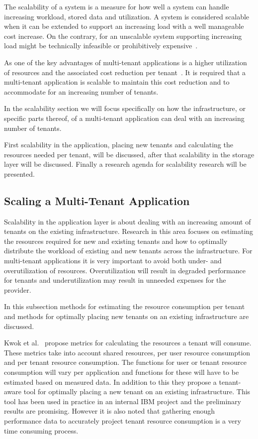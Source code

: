 The scalability of a system is a measure for how well a system can handle increasing workload, stored data and utilization.
A system is considered scalable when it can be extended to support an increasing load with a well manageable cost increase.
On the contrary, for an unscalable system supporting increasing load might be technically infeasible or prohibitively expensive~\cite{bondi2000scalability}.

As one of the key advantages of multi-tenant applications is a higher utilization of resources and the associated cost reduction per tenant~\cite{bezemer2010multi}.
It is required that a multi-tenant application is scalable to maintain this cost reduction and to accommodate for an increasing number of tenants.

In the scalability section we will focus specifically on how the infrastructure, or specific parts thereof, of a multi-tenant application can deal with an increasing number of tenants.

First scalability in the application, placing new tenants and calculating the resources needed per tenant, will be discussed, after that scalability in the storage layer will be discussed. 
Finally a research agenda for scalability research will be presented.

\subsection{Scaling a Multi-Tenant Application}
\label{sec:scal_mta}
Scalability in the application layer is about dealing with an increasing amount of tenants on the existing infrastructure.
Research in this area focuses on estimating the resources required for new and existing tenants and how to optimally distribute the workload of existing and new tenants across the infrastructure. 
For multi-tenant applications it is very important to avoid both under- and overutilization of resources.
Overutilization will result in degraded performance for tenants and underutilization may result in unneeded expenses for the provider.

In this subsection methods for estimating the resource consumption per tenant and methods for optimally placing new tenants on an existing infrastructure are discussed.

Kwok et al.~\cite{kwok2008resource} propose metrics for calculating the resources a tenant will consume.
These metrics take into account shared resources, per user resource consumption and per tenant resource consumption.
The functions for user or tenant resource consumption will vary per application and functions for these will have to be estimated based on measured data.
In addition to this they propose a tenant-aware tool for optimally placing a new tenant on an existing infrastructure.
This tool has been used in practice in an internal IBM project and the preliminary results are promising. 
However it is also noted that gathering enough performance data to accurately project tenant resource consumption is a very time consuming process.

